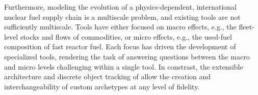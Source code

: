 Furthermore, modeling the evolution of a physics-dependent, international nuclear fuel supply
chain is a multiscale problem, and existing tools are not sufficiently 
multiscale. Tools have either focused on macro effects, e.g., the fleet-level
stocks and flows of commodities, or micro effects, e.g., the used-fuel
composition of fast reactor fuel. Each focus has driven the
development of specialized tools, rendering the task of answering questions between
the macro and micro levels challenging within a single tool. 
In constrast, the extensible architecture and discrete object tracking of \Cyclus allow
the creation and interchangeability of custom archetypes at any level of fidelity.
